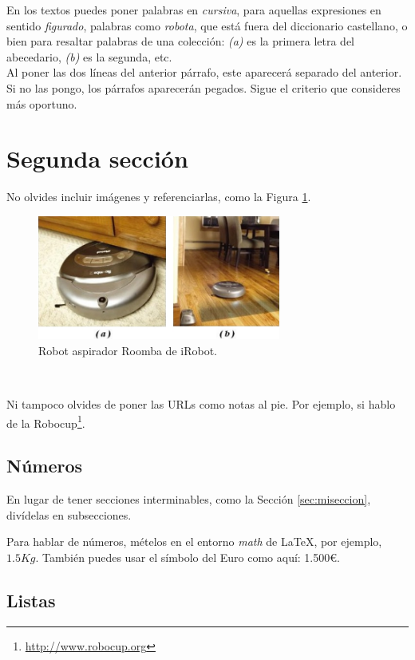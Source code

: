 En los textos puedes poner palabras en \textit{cursiva}, para aquellas expresiones en sentido \textit{figurado}, palabras como \textit{robota}, que está fuera del diccionario castellano, o bien para resaltar palabras de una colección: \textit{(a)} es la primera letra del abecedario, \textit{(b)} es la segunda, etc.\\

Al poner las dos líneas del anterior párrafo, este aparecerá separado del anterior. Si no las pongo, los párrafos aparecerán pegados. Sigue el criterio que consideres más oportuno.

\section{Segunda sección}
\label{sec:segundaseccion}

No olvides incluir imágenes y referenciarlas, como la Figura \ref{fig:roomba}.

\begin{figure} [h!]
  \begin{center}
    \includegraphics[width=8cm]{figs/roomba}
  \end{center}
  \caption{Robot aspirador Roomba de iRobot.}
  \label{fig:roomba}
\end{figure}\

Ni tampoco olvides de poner las URLs como notas al pie. Por ejemplo, si hablo de la Robocup\footnote{\url{http://www.robocup.org}}.

\subsection{Números}
\label{sec:subseccion}

En lugar de tener secciones interminables, como la Sección \ref{sec:miseccion}, divídelas en subsecciones.

Para hablar de números, mételos en el entorno \textit{math} de \LaTeX, por ejemplo, $1.5Kg$. También puedes usar el símbolo del Euro como aquí: 1.500\euro.

\subsection{Listas}

